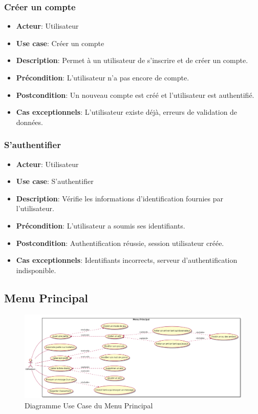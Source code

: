 \documentclass{article}
\begin{document}
\subsubsection*{Créer un compte}
\begin{itemize}
    \item \textbf{Acteur}: Utilisateur
    \item \textbf{Use case}: Créer un compte
    \item \textbf{Description}: Permet à un utilisateur de s’inscrire et de créer un compte.
    \item \textbf{Précondition}: L’utilisateur n’a pas encore de compte.
    \item \textbf{Postcondition}: Un nouveau compte est créé et l'utilisateur est authentifié.
    \item \textbf{Cas exceptionnels}: L'utilisateur existe déjà, erreurs de validation de données.
\end{itemize}

\subsubsection*{S'authentifier}
\begin{itemize}
    \item \textbf{Acteur}: Utilisateur
    \item \textbf{Use case}: S'authentifier
    \item \textbf{Description}: Vérifie les informations d'identification fournies par l'utilisateur.
    \item \textbf{Précondition}: L'utilisateur a soumis ses identifiants.
    \item \textbf{Postcondition}: Authentification réussie, session utilisateur créée.
    \item \textbf{Cas exceptionnels}: Identifiants incorrects, serveur d’authentification indisponible.
\end{itemize}

\newpage

\subsection{Menu Principal}

\begin{figure}[!h]
    \centering
    \includegraphics[width=1\textwidth]{uml/usescase/menu-principal/menu_principal.png}
    \caption{Diagramme Use Case du Menu Principal}
    \label{fig:main-menu}
\end{figure}
\end{document}
